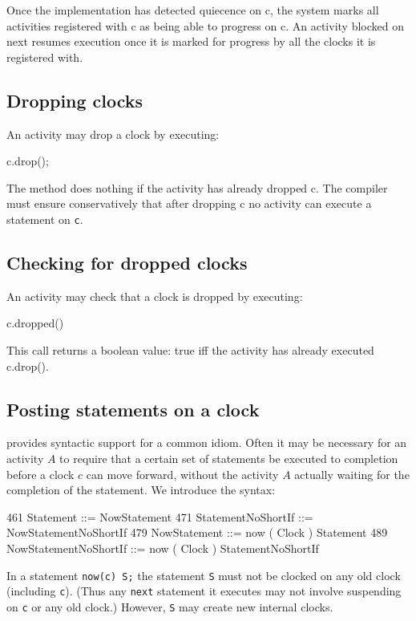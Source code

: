 Once the implementation has detected quiecence on {\cf c}, the system
marks all activities registered with {\cf c} as being able to progress
on {\cf c}. An activity blocked on {\cf next} resumes execution once
it is marked for progress by all the clocks it is registered with.


\subsection{Dropping clocks}
An activity may drop a clock by executing:
\begin{x10}
c.drop();
\end{x10}

\noindent{} 
The method does nothing if the activity has already dropped {\cf c}. 
The compiler must ensure conservatively that after dropping {\cf c} no
activity can execute a statement on {\tt c}.

\subsection{Checking for dropped clocks}
An activity may check that a clock is dropped by executing:
\begin{x10}
c.dropped()
\end{x10}
\noindent This call returns a {\cf boolean} value: {\cf true} iff the
activity has already executed {\cf c.drop()}.


\subsection{Posting statements on a clock}
\Xten{} provides syntactic support for a common idiom. Often it may be
necessary for an activity $A$ to require that a certain set of
statements be executed to completion before a clock $c$ can move
forward, without the activity $A$ actually waiting for the completion
of the statement. We introduce the syntax:
\begin{x10}
461 Statement ::= NowStatement
471 StatementNoShortIf ::= 
       NowStatementNoShortIf
479 NowStatement ::= 
       now ( Clock ) Statement
489 NowStatementNoShortIf ::= 
       now ( Clock ) StatementNoShortIf
\end{x10}
\noindent 
In a statement {\tt now(c) S;} the statement {\tt S} must not be
clocked on any old clock (including {\tt c}). (Thus any {\tt next}
statement it executes may not involve suspending on {\tt c} or
any old clock.) However, {\tt S} may create new internal clocks.

